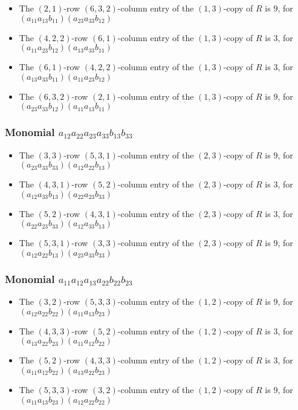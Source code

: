 \documentclass{article}
\begin{document}
\begin{itemize}
\item The $(2, 1)$-row $(6, 3, 2)$-column entry of the $ \left(1, 3\right) $-copy of $R$ is $ 9 $, for $( a_{11} a_{13} b_{11} )( a_{23} a_{33} b_{12} )$ 
\item The $(4, 2, 2)$-row $(6, 1)$-column entry of the $ \left(1, 3\right) $-copy of $R$ is $ 3 $, for $( a_{11} a_{23} b_{12} )( a_{13} a_{33} b_{11} )$ 
\item The $(6, 1)$-row $(4, 2, 2)$-column entry of the $ \left(1, 3\right) $-copy of $R$ is $ 3 $, for $( a_{13} a_{33} b_{11} )( a_{11} a_{23} b_{12} )$ 
\item The $(6, 3, 2)$-row $(2, 1)$-column entry of the $ \left(1, 3\right) $-copy of $R$ is $ 9 $, for $( a_{23} a_{33} b_{12} )( a_{11} a_{13} b_{11} )$ 
\end{itemize}
\subsubsection{Monomial $ a_{12} a_{22} a_{23} a_{33} b_{13} b_{33} $}

\begin{itemize}
\item The $(3, 3)$-row $(5, 3, 1)$-column entry of the $ \left(2, 3\right) $-copy of $R$ is $ 9 $, for $( a_{23} a_{33} b_{33} )( a_{12} a_{22} b_{13} )$ 
\item The $(4, 3, 1)$-row $(5, 2)$-column entry of the $ \left(2, 3\right) $-copy of $R$ is $ 3 $, for $( a_{12} a_{33} b_{13} )( a_{22} a_{23} b_{33} )$ 
\item The $(5, 2)$-row $(4, 3, 1)$-column entry of the $ \left(2, 3\right) $-copy of $R$ is $ 3 $, for $( a_{22} a_{23} b_{33} )( a_{12} a_{33} b_{13} )$ 
\item The $(5, 3, 1)$-row $(3, 3)$-column entry of the $ \left(2, 3\right) $-copy of $R$ is $ 9 $, for $( a_{12} a_{22} b_{13} )( a_{23} a_{33} b_{33} )$ 
\end{itemize}
\subsubsection{Monomial $ a_{11} a_{12} a_{13} a_{22} b_{22} b_{23} $}

\begin{itemize}
\item The $(3, 2)$-row $(5, 3, 3)$-column entry of the $ \left(1, 2\right) $-copy of $R$ is $ 9 $, for $( a_{12} a_{22} b_{22} )( a_{11} a_{13} b_{23} )$ 
\item The $(4, 3, 3)$-row $(5, 2)$-column entry of the $ \left(1, 2\right) $-copy of $R$ is $ 3 $, for $( a_{13} a_{22} b_{23} )( a_{11} a_{12} b_{22} )$ 
\item The $(5, 2)$-row $(4, 3, 3)$-column entry of the $ \left(1, 2\right) $-copy of $R$ is $ 3 $, for $( a_{11} a_{12} b_{22} )( a_{13} a_{22} b_{23} )$ 
\item The $(5, 3, 3)$-row $(3, 2)$-column entry of the $ \left(1, 2\right) $-copy of $R$ is $ 9 $, for $( a_{11} a_{13} b_{23} )( a_{12} a_{22} b_{22} )$ 
\end{itemize}
\end{document}
